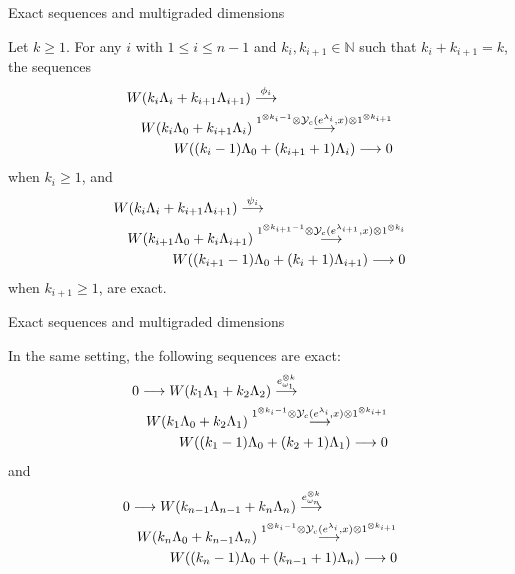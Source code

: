 \documentclass{beamer}
\begin{document}
\begin{frame}{Exact sequences and multigraded dimensions}
 \begin{theorem} 
Let $k \ge 1$. 
For any $i$ with $1 \leq i \leq n-1$ and $k_i, k_{i+1} \in \mathbb{N}$ such that 
$k_i + k_{i+1} = k$, the sequences
\begin{eqnarray} 
\lefteqn{W(k_i \Lambda_i + k_{i+1} \Lambda_{i+1}) \stackrel{\phi_i}
  \longrightarrow} \\ && W(k_i \Lambda_0 +k_{i+1} \Lambda_i)
\stackrel{1^{\otimes{k_i-1}} \otimes{\cal
    Y}_{c}(e^{\lambda_i},x)\otimes 1^{\otimes k_{i+1}}}
\longrightarrow \nonumber \\ && \hspace{2em} W((k_i-1)
\Lambda_0+(k_{i+1}+1) \Lambda_i) \longrightarrow 0 \nonumber
\end{eqnarray}
when $k_i \ge 1$, and
\begin{eqnarray} 
\lefteqn{W(k_i \Lambda_i + k_{i+1} \Lambda_{i+1}) \stackrel{\psi_i}
  \longrightarrow} \\ && W(k_{i+1} \Lambda_0 + k_i \Lambda_{i+1})
\stackrel{1^{\otimes{k_{i+1}-1}} \otimes{\cal
    Y}_{c}(e^{\lambda_{i+1}},x)\otimes 1^{\otimes k_{i}}}
\longrightarrow \nonumber \\ && \hspace{2em} W((k_{i+1}-1)
\Lambda_0+(k_i+1) \Lambda_{i+1}) \longrightarrow 0 \nonumber
\end{eqnarray}
when $k_{i+1} \ge 1$, are exact.
\end{theorem}
\end{frame}
\begin{frame}{Exact sequences and multigraded dimensions}
 \begin{corollary}
In the same setting, the following sequences are exact:
\begin{eqnarray} \label{seq1}
\lefteqn{0 \longrightarrow W(k_1 \Lambda_1 + k_2 \Lambda_2)
  \stackrel{e^{\otimes k}_{\omega_1}} \longrightarrow} \\ && W(k_1
\Lambda_0 + k_2 \Lambda_1) \stackrel{1^{\otimes{k_i-1}} \otimes{\cal
    Y}_{c}(e^{\lambda_i},x)\otimes 1^{\otimes k_{i+1}}}
\longrightarrow \nonumber \\ && \hspace{2em} W((k_1-1)
\Lambda_0+(k_2+1) \Lambda_1) \longrightarrow 0 \nonumber
\end{eqnarray}
and
\begin{eqnarray}\label{seq2}
\lefteqn{0 \longrightarrow W(k_{n-1} \Lambda_{n -1} + k_{n}
  \Lambda_{n}) \stackrel{e^{\otimes k}_{\omega_n}} \longrightarrow}
\\ && W(k_n \Lambda_0 + k_{n-1} \Lambda_n)
\stackrel{1^{\otimes{k_i-1}} \otimes{\cal
    Y}_{c}(e^{\lambda_i},x)\otimes 1^{\otimes k_{i+1}}}
\longrightarrow \nonumber \\ && \hspace{2em} W((k_n-1)
\Lambda_0+(k_{n-1}+1) \Lambda_n) \longrightarrow 0 \nonumber
\end{eqnarray}
\end{corollary}
\end{frame}
\end{document}
